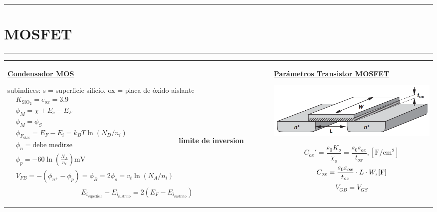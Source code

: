 \documentclass[../main.tex]{subfiles}
\begin{document}
\everymath{\displaystyle}
\vspace{0.2in}
\hrule
\vspace{0.1in}
\section{MOSFET}
\hrule
\begin{xltabular}{\textwidth}{|X|X|}
  \hline
  \endhead
  \hline
  \endfoot
  \endlastfoot
  \underline{\textbf{Condensador MOS}}

  subindices: s = superficie silicio, ox = placa de óxido aislante
  \newline\newline
  $\begin{aligned}
       & K_{\text{SiO}_2} = e_{ox} = 3.9                                      \\
       & \phi_M =\chi +E_c - E_F                                              \\
       & \phi_M =\phi_S                                                       \\
       & \phi_{F_\text{Si-N}} = E_F - E_i = k_BT\ln(N_D/n_i)                  \\
       & \phi_n = \text{debe medirse}                                         \\
       & \phi_p = -60\ln(\frac{N_A}{n_i})\si{\mV}                             \\
       & V_{FB} = - (\phi_{n^+} - \phi_p) =\phi_B = 2\phi_s = v_t\ln(N_A/n_i) \\
    \end{aligned}$
  \newline
  \textbf{límite de inversion}
  $$E_{i_\text{superficie}} - E_{i_\text{sustrato}} = 2(E_F - E_{i_\text{sustrato}})$$
  &
  \underline{\textbf{Parámetros Transistor MOSFET}}
  \begin{center}\includegraphics[scale=0.5]{assets/mosfet}\end{center}
  $$C_{ox}' = \frac{\varepsilon_0K_o}{\chi_o} = \frac{\varepsilon_0\varepsilon_{ox}}{t_{ox}}, [\si{\F\per\square\cm}]$$
  $$C_{ox} = \frac{\varepsilon_0 \varepsilon_{ox}}{t_{ox}}\cdot L\cdot W, \text{[\si{\F}]}$$
  $$V_{GB} = V_{GS}$$


\end{xltabular}
\end{document}

